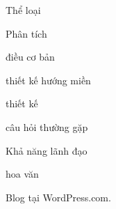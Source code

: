 Thể loại

Phân tích

điều cơ bản

thiết kế hướng miền

thiết kế

câu hỏi thường gặp

Khả năng lãnh đạo

hoa văn

Blog tại WordPress.com.













% 

% 












